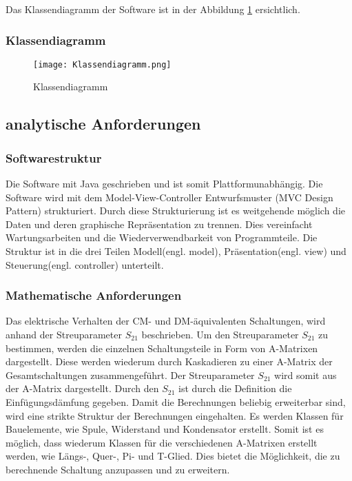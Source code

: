 Das Klassendiagramm der Software ist in der Abbildung \ref{fig:Klassendiagramm} ersichtlich.

\newpage

\subsubsection{Klassendiagramm} \label{subsubsec:Klassendiagramm}

\begin{figure}[H]
	\centering
	\texttt{[image: Klassendiagramm.png]}
	\caption{Klassendiagramm}
	\label{fig:Klassendiagramm}
\end{figure} 

\newpage

\subsection{analytische Anforderungen} \label{subsubsec:analytischeanforderungen}

\bigskip
{}
\subsubsection{Softwarestruktur} \label{subsubsec:Softwarestruktur}
Die Software mit Java geschrieben und ist somit Plattformunabhängig. Die Software wird mit dem Model-View-Controller Entwurfsmuster (MVC Design Pattern) \cite{MVCDesignPattern} strukturiert. Durch diese Strukturierung ist es weitgehende möglich die Daten und deren graphische Repräsentation zu trennen. Dies vereinfacht Wartungsarbeiten und die Wiederverwendbarkeit von Programmteile. Die Struktur ist in die drei Teilen Modell(engl. model), Präsentation(engl. view) und Steuerung(engl. controller) unterteilt.

\bigskip
\subsubsection{Mathematische Anforderungen}\label{subsubsec:mathematischeanforderungen}
Das elektrische Verhalten der CM- und DM-äquivalenten Schaltungen, wird anhand der Streuparameter $S_{21}$ beschrieben. Um den Streuparameter $S_{21}$ zu bestimmen, werden die einzelnen Schaltungsteile in Form von A-Matrixen dargestellt. Diese werden wiederum durch Kaskadieren zu einer A-Matrix der Gesamtschaltungen  zusammengeführt. Der Streuparameter $S_{21}$ wird somit aus der A-Matrix dargestellt. Durch den $S_{21}$ ist durch die Definition die Einfügungsdämfung gegeben. Damit die Berechnungen beliebig erweiterbar sind, wird eine strikte Struktur der Berechnungen eingehalten. Es werden Klassen für Bauelemente, wie Spule, Widerstand und Kondensator erstellt. Somit ist es möglich, dass wiederum Klassen für die verschiedenen A-Matrixen erstellt werden, wie Längs-, Quer-, Pi- und T-Glied. Dies bietet die Möglichkeit, die zu berechnende Schaltung anzupassen und zu erweitern.
\bigskip
